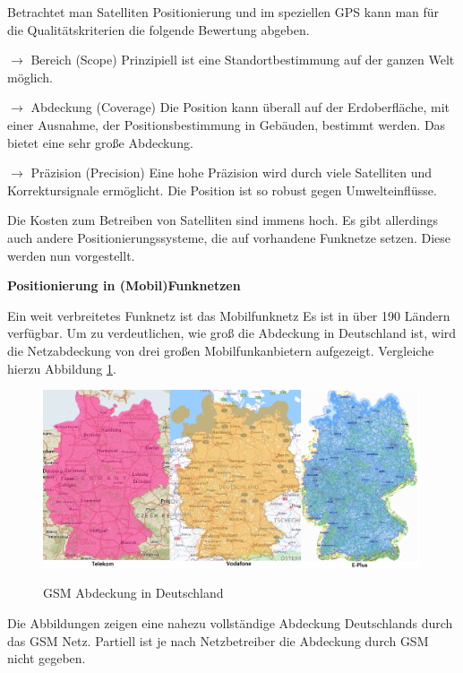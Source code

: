 Betrachtet man Satelliten Positionierung und im speziellen GPS kann man für die Qualitätskriterien die folgende Bewertung abgeben.

$\longrightarrow$ Bereich (Scope) Prinzipiell ist eine Standortbestimmung auf der ganzen Welt möglich.

$\longrightarrow$ Abdeckung (Coverage) Die Position kann überall auf der Erdoberfläche, mit einer Ausnahme, der Positionsbestimmung in Gebäuden, bestimmt werden. Das bietet eine sehr große Abdeckung.

$\longrightarrow$ Präzision (Precision) Eine hohe Präzision wird durch viele Satelliten und Korrektursignale ermöglicht. Die Position ist so  robust gegen Umwelteinflüsse.

\cite[S. 187]{Schiller2004}

Die Kosten zum Betreiben von Satelliten sind immens hoch. Es gibt allerdings auch andere Positionierungssysteme, die auf vorhandene Funknetze setzen. Diese werden nun vorgestellt.

\textbf{Positionierung in (Mobil)Funknetzen}

Ein weit verbreitetes Funknetz ist das Mobilfunknetz Es ist in über 190 Ländern verfügbar.\cite[206]{Schiller2004} Um zu verdeutlichen, wie groß die Abdeckung in Deutschland ist, wird die Netzabdeckung von drei großen Mobilfunkanbietern aufgezeigt. Vergleiche hierzu Abbildung \ref{fig:GSM}.

\begin{figure}[h]
\centering
\includegraphics[width=0.99\textwidth]{ref/images/GSM.PNG}
\caption[GSM Abdeckung in Deutschland]{GSM Abdeckung in Deutschland}
\label{fig:GSM}
\cite{Telekom} \cite{Vodafone} \cite{Eplus}
\end{figure}

Die Abbildungen zeigen eine nahezu vollständige Abdeckung Deutschlands durch das GSM Netz. Partiell ist je nach Netzbetreiber die Abdeckung durch GSM nicht gegeben.

